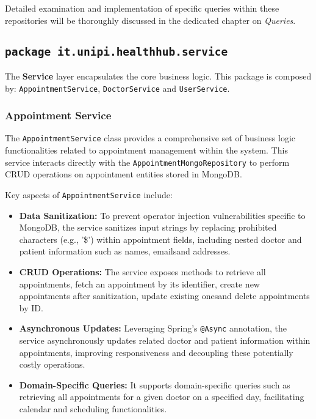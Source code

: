 Detailed examination and implementation of specific queries within these repositories will be thoroughly discussed in the dedicated chapter on \textit{Queries}. 

\subsection{\texttt{package it.unipi.healthhub.service}}
The \textbf{Service} layer encapsulates the core business logic. This package is composed by: \texttt{AppointmentService}, \texttt{DoctorService} and \texttt{UserService}. 


\subsubsection{Appointment Service}
The \texttt{AppointmentService} class provides a comprehensive set of business logic functionalities related to appointment management within the system. This service interacts directly with the \texttt{AppointmentMongoRepository} to perform CRUD operations on appointment entities stored in MongoDB.

Key aspects of \texttt{AppointmentService} include:
\begin{itemize}
	\item \textbf{Data Sanitization:} To prevent operator injection vulnerabilities specific to MongoDB, the service sanitizes input strings by replacing prohibited characters (e.g., '\$') within appointment fields, including nested doctor and patient information such as names, emailsand addresses.
	
	\item \textbf{CRUD Operations:} The service exposes methods to retrieve all appointments, fetch an appointment by its identifier, create new appointments after sanitization, update existing onesand delete appointments by ID.
	
	\item \textbf{Asynchronous Updates:} Leveraging Spring's \texttt{@Async} annotation, the service asynchronously updates related doctor and patient information within appointments, improving responsiveness and decoupling these potentially costly operations.
	
	\item \textbf{Domain-Specific Queries:} It supports domain-specific queries such as retrieving all appointments for a given doctor on a specified day, facilitating calendar and scheduling functionalities.
\end{itemize}

